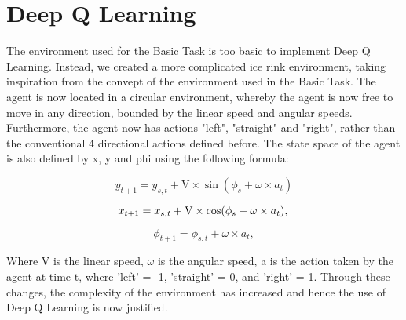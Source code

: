 \renewcommand{\thesection}{Advanced Task}
\section{Deep Q Learning}
The environment used for the Basic Task is too basic to implement Deep Q Learning. Instead, we created a more complicated ice rink environment, taking inspiration from the convept of the environment used in the Basic Task. The agent is now located in a circular environment, whereby the agent is now free to move in any direction, bounded by the linear speed and angular speeds. Furthermore, the agent now has actions "left", "straight" and "right", rather than the conventional 4 directional actions defined before. The state space of the agent is also defined by x, y and phi using the following formula:

\begin{equation}
    y_{t+1} = y_{s,t} + \text{V} \times \sin(\phi_s + \omega \times a_t)
\end{equation}

\begin{equation}
    x_{t+1} = x_{s,t} + \text{V} \times \cos(\phi_s + \omega \times a_t), \\
\end{equation}

\begin{equation}
    \phi_{t+1} = \phi_{s,t} + \omega \times a_t,
\end{equation}

Where V is the linear speed, $\omega$ is the angular speed, a is the action taken by the agent at time t, where 'left' = -1, 'straight' = 0, and 'right' = 1. Through these changes, the complexity of the environment has increased and hence the use of Deep Q Learning is now justified.
